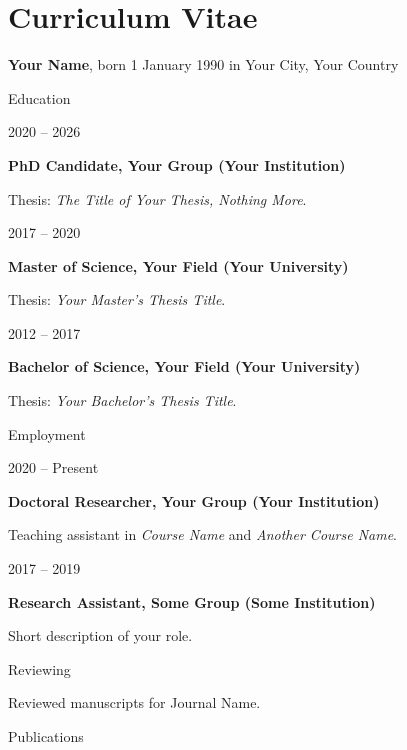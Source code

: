 \chapter*{Curriculum Vitae}

\newcommand{\cvsection}[1]{%
  \vspace{1.2em}%
  {\small #1}\par
}

\newcommand{\cventryloc}[3]{%
  \noindent
  \begin{minipage}[t]{0.2\textwidth}
    \raggedright\small #1
  \end{minipage}\hfill
  \begin{minipage}[t]{0.8\textwidth}
    \small
    \textbf{#2}\par
    #3
  \end{minipage}\par
}

{\small \textbf{Your Name}, born 1 January 1990 in Your City, Your Country}

\cvsection{Education}

\cventryloc{2020 -- 2026}{PhD Candidate, Your Group (Your Institution)}{%
  Thesis: \textit{The Title of Your Thesis, Nothing More}.%
}

\cventryloc{2017 -- 2020}{Master of Science, Your Field (Your University)}{%
  Thesis: \textit{Your Master's Thesis Title}.%
}

\cventryloc{2012 -- 2017}{Bachelor of Science, Your Field (Your University)}{%
  Thesis: \textit{Your Bachelor's Thesis Title}.%
}

\cvsection{Employment}

\cventryloc{2020 -- Present}{Doctoral Researcher, Your Group (Your Institution)}{%
  Teaching assistant in \textit{Course Name} and \textit{Another Course Name}.%
}

\cventryloc{2017 -- 2019}{Research Assistant, Some Group (Some Institution)}{%
  Short description of your role.%
}

\cvsection{Reviewing}
{\small Reviewed manuscripts for Journal Name.}

\cvsection{Publications}
\begin{refsection}
  \nocite{Author2026a, Author2026b}
  \printbibliography[heading=none,env=compactbib]
\end{refsection}

